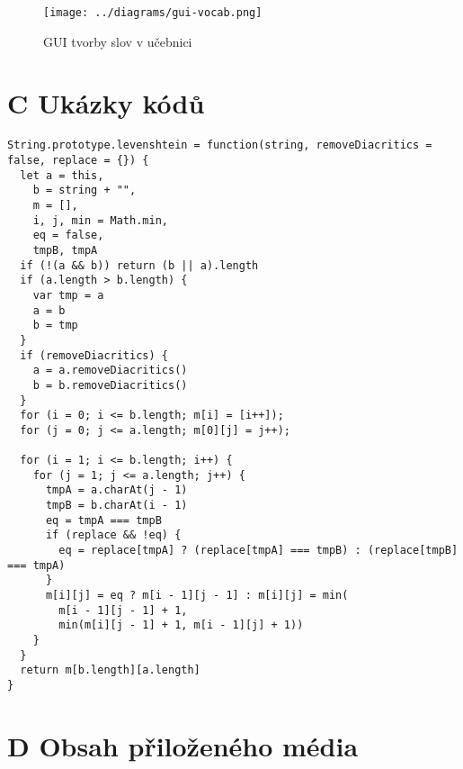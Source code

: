 \documentclass[a4paper,11pt,titlepage,fleqn]{article}
\begin{document}
\begin{figure}[ht!]
    \centering
    \texttt{[image: ../diagrams/gui-vocab.png]}
    \caption{GUI tvorby slov v učebnici}
\end{figure}

\newpage
\thispagestyle{plain}
\section*{C Ukázky kódů}

\begin{lstlisting}[language=JS, caption={Implementace algoritmu pro výpočet Levenshteinovy vzdálenosti},label=code:levenshtein-full]
String.prototype.levenshtein = function(string, removeDiacritics = false, replace = {}) {
  let a = this,
    b = string + "",
    m = [],
    i, j, min = Math.min,
    eq = false,
    tmpB, tmpA
  if (!(a && b)) return (b || a).length
  if (a.length > b.length) {
    var tmp = a
    a = b
    b = tmp
  }
  if (removeDiacritics) {
    a = a.removeDiacritics()
    b = b.removeDiacritics()
  }
  for (i = 0; i <= b.length; m[i] = [i++]);
  for (j = 0; j <= a.length; m[0][j] = j++);

  for (i = 1; i <= b.length; i++) {
    for (j = 1; j <= a.length; j++) {
      tmpA = a.charAt(j - 1)
      tmpB = b.charAt(i - 1)
      eq = tmpA === tmpB
      if (replace && !eq) {
        eq = replace[tmpA] ? (replace[tmpA] === tmpB) : (replace[tmpB] === tmpA)
      }
      m[i][j] = eq ? m[i - 1][j - 1] : m[i][j] = min(
        m[i - 1][j - 1] + 1,
        min(m[i][j - 1] + 1, m[i - 1][j] + 1))
    }
  }
  return m[b.length][a.length]
}
\end{lstlisting}

\newpage
\thispagestyle{plain}
\section*{D Obsah přiloženého média}
\begin{figure}[ht!]
\end{figure}
\end{document}
